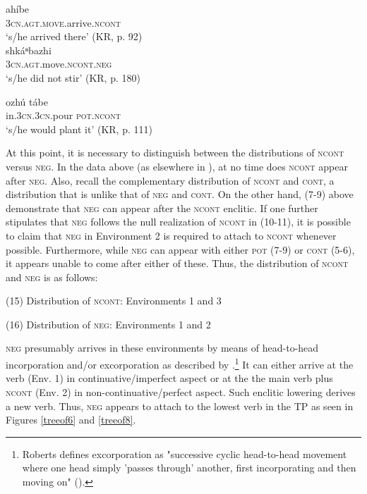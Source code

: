 \documentclass[output=paper]{LSP/langsci}
\begin{document}
  \gll ahíbe  \\
  \textsc{3cn.agt.move}.arrive.\textsc{ncont}  \\
  \glt `s/he arrived there' (KR, p. 92)   \\

  \ex 
  \gll shkáⁿbazhi   ~\,\, \\
  \textsc{3cn.agt}.move.\textsc{ncont.neg}   \\
  \glt `s/he did not stir' (KR, p. 180)    

  \ex
  \gll ozhú	tábe	  \\
  in.\textsc{3cn.3cn}.pour \textsc{pot.ncont}\,   \\
  \glt `s/he would plant it' (KR, p. 111)    
  \z 
\z 

\vspace{1em}
At this point, it is necessary to distinguish between the distributions of \textsc{ncont} versus \textsc{neg}. In the data above (as elsewhere in ), at no time does \textsc{ncont} appear after \textsc{neg}. Also, recall the complementary distribution of \textsc{ncont} and \textsc{cont}, a distribution that is unlike that of \textsc{neg} and \textsc{cont}. On the other hand, (7-9) above demonstrate that \textsc{neg} can appear after the \textsc{ncont} enclitic. If one further stipulates that \textsc{neg} follows the null realization of \textsc{ncont} in (10-11), it is possible to claim that \textsc{neg} in Environment 2 is required to attach to \textsc{ncont} whenever possible. Furthermore, while \textsc{neg} can appear with either \textsc{pot} (7-9) or \textsc{cont} (5-6), it appears unable to come after either of these. Thus, the distribution of \textsc{ncont} and \textsc{neg} is as follows:

\vspace{1em}
(15)	Distribution of \textsc{ncont}:	Environments 1 and 3

\vspace{1em}
(16)	Distribution of \textsc{neg}:	Environments 1 and 2

\vspace{1em}
\textsc{neg} presumably arrives in these environments by means of head-to-head incorporation and/or excorporation as described by \citet{Roberts1991}.\footnote{Roberts defines excorporation as "successive cyclic head-to-head movement where one head simply 'passes through' another, first incorporating and then moving on" (\citeyear[211]{Roberts1991}).} It can either arrive at the verb (Env. 1) in continuative/imperfect aspect or at the the main verb plus \textsc{ncont} (Env. 2) in non-continuative/perfect aspect. Such enclitic lowering derives a new verb. Thus, \textsc{neg} appears to attach to the lowest verb in the TP as seen in Figures \ref{treeof6} and \ref{treeof8}.
\end{document}
